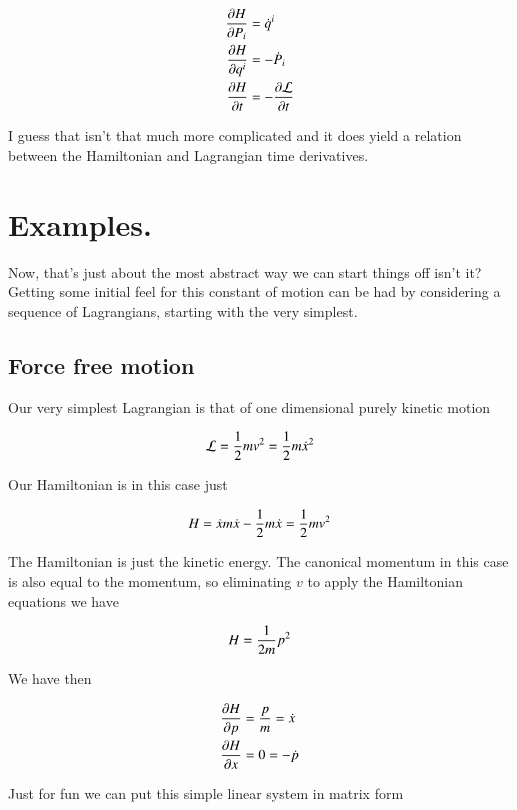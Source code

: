 \begin{align}\label{eqn:hamiltonian:hoo5}
\PD{P_i}{H} &= \qdot^i  \\
\PD{q^i}{H} &= - \dot{P}_i  \\
\PD{t}{H}   &= - \PD{t}{\LL} 
\end{align}

I guess that isn't that much more complicated and it does yield a relation between the Hamiltonian and Lagrangian time derivatives.

\section{Examples.}

Now, that's just about the most abstract way we can start things off isn't it?  Getting some initial feel for this constant of motion can be had by considering a sequence of Lagrangians, starting with the very simplest.

\subsection{Force free motion}

Our very simplest Lagrangian is that of one dimensional purely kinetic motion

\begin{align}\label{eqn:hamiltonian:boo1}
\LL = \inv{2} m v^2 = \inv{2} m \xdot^2
\end{align}

Our Hamiltonian is in this case just

\begin{align}\label{eqn:hamiltonian:boo2}
H = \xdot m \xdot - \inv{2} m \xdot = \inv{2} m v^2
\end{align}

The Hamiltonian is just the kinetic energy.  The canonical momentum in this case is also equal to the momentum, so eliminating $v$ to apply the Hamiltonian equations we have

\begin{align}\label{eqn:hamiltonian:boo3}
H = \inv{2m} p^2
\end{align}

We have then

\begin{align*}
\PD{p}{H} &= \frac{p}{m} = \dot{x} \\
\PD{x}{H} &= 0 = -\dot{p} 
\end{align*}

Just for fun we can put this simple linear system in matrix form

